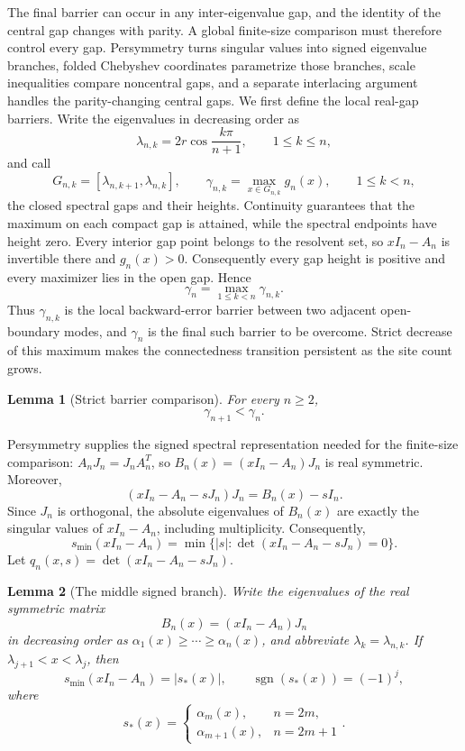 \documentclass[12pt,anonymous]{iopjournal}
\numberwithin{equation}{section}
\newtheorem{lemma}[lemma]{Lemma}
\theoremstyle{remark}
\begin{document}
The final barrier can occur in any inter-eigenvalue gap, and the identity of
the central gap changes with parity.  A global finite-size comparison must
therefore control every gap.  Persymmetry turns singular values into signed
eigenvalue branches, folded Chebyshev coordinates parametrize those
branches, scale inequalities compare noncentral gaps, and a separate
interlacing argument handles the parity-changing central gaps.  We first
define the local real-gap barriers.
Write the eigenvalues in decreasing order as
\[
 \lambda_{n,k}=2r\cos\frac{k\pi}{n+1},\qquad 1\leq k\leq n,
\]
and call
\[
 G_{n,k}=[\lambda_{n,k+1},\lambda_{n,k}],\qquad
 \gamma_{n,k}=\max_{x\in G_{n,k}}g_n(x),\qquad 1\leq k<n,
\]
the closed spectral gaps and their heights.  Continuity guarantees that the
maximum on each compact gap is attained, while the spectral endpoints have
height zero.  Every
interior gap point belongs to the resolvent set, so \(xI_n-A_n\) is invertible
there and \(g_n(x)>0\).  Consequently every gap height is positive and every
maximizer lies in the open gap.  Hence
\begin{equation}\label{eq:gamma-def}
 \gamma_n=\max_{1\leq k<n}\gamma_{n,k}.
\end{equation}
Thus \(\gamma_{n,k}\) is the local backward-error barrier between two
adjacent open-boundary modes, and \(\gamma_n\) is the final such barrier to
be overcome.  Strict decrease of this maximum makes the connectedness
transition persistent as the site count grows.

\begin{lemma}[Strict barrier comparison]\label{lem:mesh}
For every \(n\geq2\),
\[
 \gamma_{n+1}<\gamma_n.
\]
\end{lemma}

Persymmetry supplies the signed spectral representation needed for the
finite-size comparison:
\(A_nJ_n=J_nA_n^T\), so
\(B_n(x)=(xI_n-A_n)J_n\) is real symmetric.  Moreover,
\[
 (xI_n-A_n-sJ_n)J_n=B_n(x)-sI_n.
\]
Since \(J_n\) is orthogonal, the absolute eigenvalues of \(B_n(x)\)
are exactly the singular values of \(xI_n-A_n\), including multiplicity.
Consequently,
\begin{equation}\label{eq:signed-pencil}
 s_{\min}(xI_n-A_n)
 =\min\{|s|:\det(xI_n-A_n-sJ_n)=0\}.
\end{equation}
Let \(q_n(x,s)=\det(xI_n-A_n-sJ_n)\).
\begin{lemma}[The middle signed branch]\label{lem:middle-branch}
Write the eigenvalues of the real symmetric matrix
\[
 B_n(x)=(xI_n-A_n)J_n
\]
in decreasing order as
\(\alpha_1(x)\geq\cdots\geq\alpha_n(x)\), and abbreviate
\(\lambda_k=\lambda_{n,k}\).
If \(\lambda_{j+1}<x<\lambda_j\), then
\[
 s_{\min}(xI_n-A_n)=|s_*(x)|,
 \qquad \operatorname{sgn}(s_*(x))=(-1)^j,
\]
where
\[
 s_*(x)=
 \begin{cases}
  \alpha_m(x),&n=2m,\\
  \alpha_{m+1}(x),&n=2m+1
 \end{cases}.
\]
\end{lemma}
\end{document}
